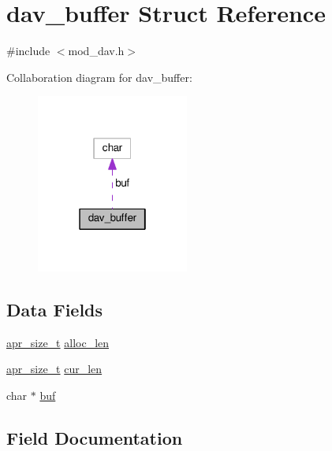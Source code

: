 \hypertarget{structdav__buffer}{}\section{dav\+\_\+buffer Struct Reference}
\label{structdav__buffer}


{\ttfamily \#include $<$mod\+\_\+dav.\+h$>$}



Collaboration diagram for dav\+\_\+buffer\+:
\nopagebreak
\begin{figure}[H]
\begin{center}
\leavevmode
\includegraphics[width=142pt]{structdav__buffer__coll__graph}
\end{center}
\end{figure}
\subsection*{Data Fields}
\begin{DoxyCompactItemize}
\item 
\hyperlink{group__apr__platform_gaaa72b2253f6f3032cefea5712a27540e}{apr\+\_\+size\+\_\+t} \hyperlink{structdav__buffer_a08afb816368f6e602d8e0b9ffeebaaae}{alloc\+\_\+len}
\item 
\hyperlink{group__apr__platform_gaaa72b2253f6f3032cefea5712a27540e}{apr\+\_\+size\+\_\+t} \hyperlink{structdav__buffer_a8d43337c127b3e07aada116e7f3cb2a9}{cur\+\_\+len}
\item 
char $\ast$ \hyperlink{structdav__buffer_ab55f9f7e74cadc2abbc7f4fc99090f01}{buf}
\end{DoxyCompactItemize}


\subsection{Field Documentation}
